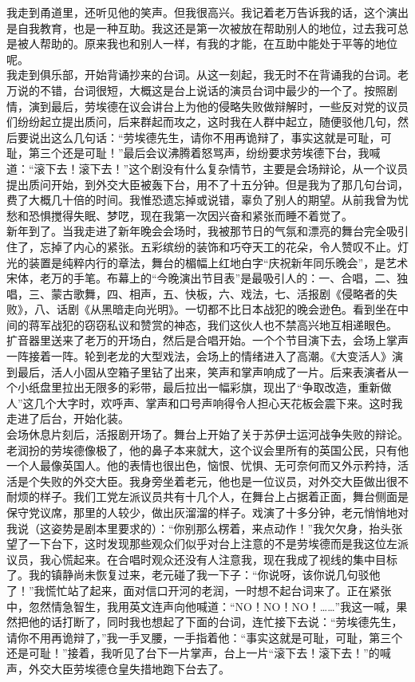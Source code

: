 我走到甬道里，还听见他的笑声。但我很高兴。我记着老万告诉我的话，这个演出是自我教育，也是一种互助。我这还是第一次被放在帮助别人的地位，过去我可总是被人帮助的。原来我也和别人一样，有我的才能，在互助中能处于平等的地位呢。\\

我走到俱乐部，开始背诵抄来的台词。从这一刻起，我无时不在背诵我的台词。老万说的不错，台词很短，大概这是台上说话的演员台词中最少的一个了。按照剧情，演到最后，劳埃德在议会讲台上为他的侵略失败做辩解时，一些反对党的议员们纷纷起立提出质问，后来群起而攻之，这时我在人群中起立，随便驳他几句，然后要说出这么几句话：“劳埃德先生，请你不用再诡辩了，事实这就是可耻，可耻，第三个还是可耻！”最后会议沸腾着怒骂声，纷纷要求劳埃德下台，我喊道：“滚下去！滚下去！”这个剧没有什么复杂情节，主要是会场辩论，从一个议员提出质问开始，到外交大臣被轰下台，用不了十五分钟。但是我为了那几句台词，费了大概几十倍的时间。我惟恐遗忘掉或说错，辜负了别人的期望。从前我曾为忧愁和恐惧搅得失眠、梦呓，现在我第一次因兴奋和紧张而睡不着觉了。\\

新年到了。当我走进了新年晚会会场时，我被那节日的气氛和漂亮的舞台完全吸引住了，忘掉了内心的紧张。五彩缤纷的装饰和巧夺天工的花朵，令人赞叹不止。灯光的装置是纯粹内行的章法，舞台的楣幅上红地白字“庆祝新年同乐晚会”，是艺术宋体，老万的手笔。布幕上的“今晚演出节目表”是最吸引人的：一、合唱，二、独唱，三、蒙古歌舞，四、相声，五、快板，六、戏法，七、活报剧《侵略者的失败》，八、话剧《从黑暗走向光明》。一切都不比日本战犯的晚会逊色。看到坐在中间的蒋军战犯的窃窃私议和赞赏的神态，我们这伙人也不禁高兴地互相递眼色。\\

扩音器里送来了老万的开场白，然后是合唱开始。一个个节目演下去，会场上掌声一阵接着一阵。轮到老龙的大型戏法，会场上的情绪进入了高潮。《大变活人》演到最后，活人小固从空箱子里钻了出来，笑声和掌声响成了一片。后来表演者从一个小纸盘里拉出无限多的彩带，最后拉出一幅彩旗，现出了“争取改造，重新做人”这几个大字时，欢呼声、掌声和口号声响得令人担心天花板会震下来。这时我走进了后台，开始化装。\\

会场休息片刻后，活报剧开场了。舞台上开始了关于苏伊士运河战争失败的辩论。老润扮的劳埃德像极了，他的鼻子本来就大，这个议会里所有的英国公民，只有他一个人最像英国人。他的表情也很出色，恼恨、忧惧、无可奈何而又外示矜持，活活是个失败的外交大臣。我身旁坐着老元，他也是一位议员，对外交大臣做出很不耐烦的样子。我们工党左派议员共有十几个人，在舞台上占据着正面，舞台侧面是保守党议席，那里的人较少，做出灰溜溜的样子。戏演了十多分钟，老元悄悄地对我说（这姿势是剧本里要求的）：“你别那么楞着，来点动作！”我欠欠身，抬头张望了一下台下，这时发现那些观众们似乎对台上注意的不是劳埃德而是我这位左派议员，我心慌起来。在合唱时观众还没有人注意我，现在我成了视线的集中目标了。我的镇静尚未恢复过来，老元碰了我一下子：“你说呀，该你说几句驳他了！”我慌忙站了起来，面对信口开河的老润，一时想不起台词来了。正在紧张中，忽然情急智生，我用英文连声向他喊道：“NO！NO！NO！……”我这一喊，果然把他的话打断了，同时我也想起了下面的台词，连忙接下去说：“劳埃德先生，请你不用再诡辩了，”我一手叉腰，一手指着他：“事实这就是可耻，可耻，第三个还是可耻！”接着，我听见了台下一片掌声，台上一片“滚下去！滚下去！”的喊声，外交大臣劳埃德仓皇失措地跑下台去了。\\

